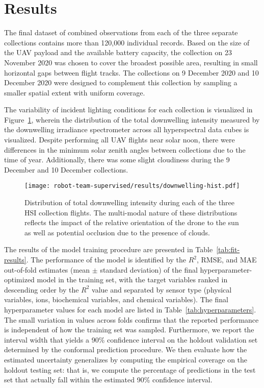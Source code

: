 \section{Results}


The final dataset of combined observations from each of the three separate
collections contains more than 120,000 individual records. Based on the size of
the UAV payload and the available battery capacity, the collection on 23
November 2020 was chosen to cover the broadest possible area, resulting in small
horizontal gaps between flight tracks. The collections on 9 December 2020 and 10
December 2020 were designed to complement this collection by sampling a smaller
spatial extent with uniform coverage.

The variability of incident lighting conditions for each collection is
visualized in Figure~\ref{fig:downwelling-hist}, wherein the distribution of the
total downwelling intensity measured by the downwelling irradiance spectrometer
across all hyperspectral data cubes is visualized. Despite performing all UAV
flights near solar noon, there were differences in the minimum solar zenith
angles between collections due to the time of year. Additionally, there was some
slight cloudiness during the 9 December and 10 December collections.

\begin{figure}[h!]
  \centering
  \texttt{[image: robot-team-supervised/results/downwelling-hist.pdf]}
  \caption{Distribution of total downwelling intensity during each of the three
    HSI collection flights. The multi-modal nature of these distributions
    reflects the impact of the relative orientation of the drone to the sun as
    well as potential occlusion due to the presence of
    clouds.\label{fig:downwelling-hist}}
\end{figure}   

The results of the model training procedure are presented in
Table~\ref{tab:fit-results}. The performance of the model is identified by the
$R^2$, RMSE, and MAE out-of-fold estimates (mean $\pm$ standard deviation) of
the final hyperparameter-optimized model in the training set, with the target
variables ranked in descending order by the $R^2$ value and separated by sensor
type (physical variables, ions, biochemical variables, and chemical variables).
The final hyperparameter values for each model are listed in
Table~\ref{tab:hyperparameters}. The small variation in values across folds
confirms that the reported performance is independent of how the training set
was sampled. Furthermore, we report the interval width that yields a 90\%
confidence interval on the holdout validation set determined by the conformal
prediction procedure. We then evaluate how the estimated uncertainty generalizes
by computing the empirical coverage on the holdout testing set: that is, we
compute the percentage of predictions in the test set that actually fall within
the estimated 90\% confidence interval.


